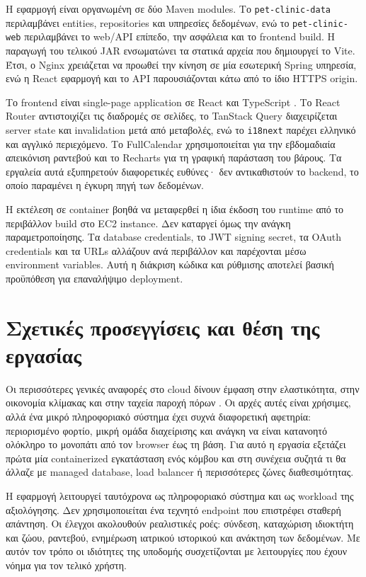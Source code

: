 Η εφαρμογή είναι οργανωμένη σε δύο Maven modules. Το
\texttt{pet-clinic-data} περιλαμβάνει entities, repositories και υπηρεσίες
δεδομένων, ενώ το \texttt{pet-clinic-web} περιλαμβάνει το web/API επίπεδο,
την ασφάλεια και το frontend build. Η παραγωγή του τελικού JAR ενσωματώνει τα
στατικά αρχεία που δημιουργεί το Vite. Έτσι, ο Nginx χρειάζεται να προωθεί
την κίνηση σε μία εσωτερική Spring υπηρεσία, ενώ η React εφαρμογή και το API
παρουσιάζονται κάτω από το ίδιο HTTPS origin.

Το frontend είναι single-page application σε React και TypeScript
\cite{react2026docs}. Το
React Router αντιστοιχίζει τις διαδρομές σε σελίδες, το TanStack Query
διαχειρίζεται server state και invalidation μετά από μεταβολές, ενώ το
\texttt{i18next} παρέχει ελληνικό και αγγλικό περιεχόμενο. Το FullCalendar
χρησιμοποιείται για την εβδομαδιαία απεικόνιση ραντεβού και το Recharts για
τη γραφική παράσταση του βάρους. Τα εργαλεία αυτά εξυπηρετούν διαφορετικές
ευθύνες· δεν αντικαθιστούν το backend, το οποίο παραμένει η έγκυρη πηγή των
δεδομένων.

Η εκτέλεση σε container βοηθά να μεταφερθεί η ίδια έκδοση του runtime από το
περιβάλλον build στο EC2 instance. Δεν καταργεί όμως την ανάγκη
παραμετροποίησης. Τα database credentials, το JWT signing secret, τα OAuth
credentials και τα URLs αλλάζουν ανά περιβάλλον και παρέχονται μέσω
environment variables. Αυτή η διάκριση κώδικα και ρύθμισης αποτελεί βασική
προϋπόθεση για επαναλήψιμο deployment.

\section{Σχετικές προσεγγίσεις και θέση της εργασίας}

Οι περισσότερες γενικές αναφορές στο cloud δίνουν έμφαση στην ελαστικότητα,
στην οικονομία κλίμακας και στην ταχεία παροχή πόρων
\cite{armbrust2010view}. Οι αρχές αυτές είναι χρήσιμες, αλλά ένα μικρό
πληροφοριακό σύστημα έχει συχνά διαφορετική αφετηρία: περιορισμένο φορτίο,
μικρή ομάδα διαχείρισης και ανάγκη να είναι κατανοητό ολόκληρο το μονοπάτι
από τον browser έως τη βάση. Για αυτό η εργασία εξετάζει πρώτα μία
containerized εγκατάσταση ενός κόμβου και στη συνέχεια συζητά τι θα άλλαζε
με managed database, load balancer ή περισσότερες ζώνες διαθεσιμότητας.

Η εφαρμογή λειτουργεί ταυτόχρονα ως πληροφοριακό σύστημα και ως workload της
αξιολόγησης. Δεν χρησιμοποιείται ένα τεχνητό endpoint που επιστρέφει σταθερή
απάντηση. Οι έλεγχοι ακολουθούν ρεαλιστικές ροές: σύνδεση, καταχώριση
ιδιοκτήτη και ζώου, ραντεβού, ενημέρωση ιατρικού ιστορικού και ανάκτηση των
δεδομένων. Με αυτόν τον τρόπο οι ιδιότητες της υποδομής συσχετίζονται με
λειτουργίες που έχουν νόημα για τον τελικό χρήστη.

